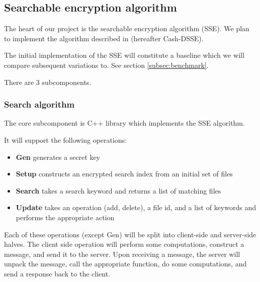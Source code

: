 \documentclass[onecolumn, draftclsnofoot,10pt, compsoc]{IEEEtran}
\begin{document}
\subsection{ Searchable encryption algorithm }
\label{subsec:sse}




The heart of our project is the searchable encryption algorithm (SSE).
We plan to implement the algorithm described in \cite{cash14} (hereafter Cash-DSSE).

The initial implementation of the SSE will constitute a baseline which we will compare subsequent variations to. 
See section \ref{subsec:benchmark}.


There are 3 subcomponents.

\subsubsection{ Search algorithm }

The core subcomponent is C++ library which implements the SSE algorithm. 

It will support the following operations:
\begin{itemize}
\item \textbf{Gen} generates a secret key
\item \textbf{Setup} constructs an encrypted search index from an initial set of files
\item \textbf{Search} takes a search keyword and returns a list of matching files
\item \textbf{Update} takes an operation (add, delete), a file id, and a list of keywords and performs the appropriate action
\end{itemize}

Each of these operations (except Gen) will be split into client-side and server-side halves.
The client side operation will perform some computations, construct a message, and send it to the server.
Upon receiving a message, the server will unpack the message, 
call the appropriate function, do some computations,
and send a response back to the client.
\end{document}

